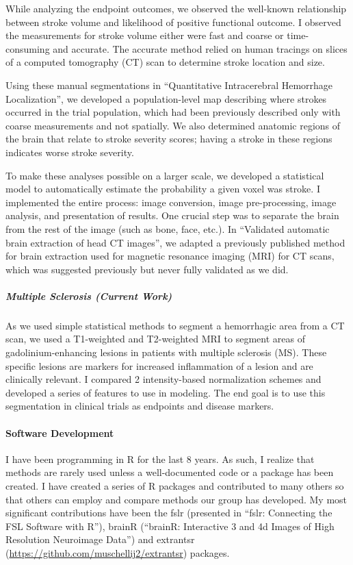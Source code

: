 \documentclass[12pt,a4paper]{article}
\begin{document}
While analyzing the endpoint outcomes, we observed the well-known relationship between stroke volume and likelihood of positive functional outcome.  I observed the measurements for stroke volume either were fast and coarse or time-consuming and accurate.  The accurate method relied on human tracings on slices of a computed tomography (CT) scan to determine stroke location and size.  

Using these manual segmentations in ``Quantitative Intracerebral Hemorrhage Localization'', we developed a population-level map describing where strokes occurred in the trial population, which had been previously described only with coarse measurements and not spatially.  We also determined anatomic regions of the brain that relate to stroke severity scores; having a stroke in these regions indicates worse stroke severity.

To make these analyses possible on a larger scale, we developed a statistical model to automatically estimate the probability a given voxel was stroke.  I implemented the entire process: image conversion, image pre-processing, image analysis, and presentation of results.  One crucial step was to separate the brain from the rest of the image (such as bone, face, etc.).  In ``Validated automatic brain extraction of head CT images'', we adapted a previously published method for brain extraction used for magnetic resonance imaging (MRI) for CT scans, which was suggested previously but never fully validated as we did.



\subparagraph{Multiple Sclerosis (Current Work)} As we used simple statistical methods to segment a hemorrhagic area from a CT scan, we used a T1-weighted and T2-weighted MRI to segment areas of gadolinium-enhancing lesions in patients with multiple sclerosis (MS).  These specific lesions are markers for increased inflammation of a lesion and are clinically relevant.  I compared 2 intensity-based normalization schemes and developed a series of features to use in modeling.  The end goal is to use this segmentation in clinical trials as endpoints and disease markers.

\paragraph{Software Development} I have been programming in R for the last 8 years.  As such, I realize that methods are rarely used unless a well-documented code or a package has been created.  I have created a series of R packages and contributed to many others so that others can employ and compare methods our group has developed.  My most significant contributions have been the fslr (presented in ``fslr: Connecting the FSL Software with R''), brainR (``brainR: Interactive 3 and 4d Images of High Resolution Neuroimage Data'') and extrantsr (\url{https://github.com/muschellij2/extrantsr}) packages.  
\end{document}
